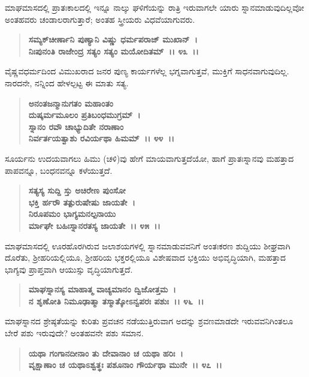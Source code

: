 ಮಾಘಮಾಸದಲ್ಲಿ ಪ್ರಾತಃಕಾಲದಲ್ಲಿ ಇನ್ನೂ ನಾಲ್ಕು ಘಳಿಗೆಯನ್ನು ರಾತ್ರಿ ಇರುವಾಗಲೇ ಯಾರು ಸ್ನಾನಮಾಡುವುದಿಲ್ಲವೋ ಅಂತಹವರು ಚಂಡಾಲರಾಗುತ್ತಾರೆ; ಅಂತಹ ಸ್ತ್ರೀಯರು ವಿಧವೆಯಾಗುವರು.

\begin{verse}
\textbf{ಸಮ್ಯಕ್‌ಚೀರ್ಣಾನಿ ಪುಣ್ಯಾನಿ ವಿಷ್ಣು ಧರ್ಮಪರಾಜ್ ಮುಖಾನ್~।}\\\textbf{ನಿಃಪುನಂತಿ ರಾಜೇಂದ್ರ ಸತ್ಯಂ ಸತ್ಯಂ ಮಯೋದಿತಮ್~।। ೪೩~।।}
\end{verse}

ವೈಷ್ಣವಧರ್ಮದಿಂದ ವಿಮುಖರಾದ ಜನರ ಪುಣ್ಯ ಕಾರ್ಯಗಳೆಲ್ಲ ಭಗ್ನವಾಗುತ್ತವೆ, ಮುಕ್ತಿಗೆ ಸಾಧನವಾಗುವುದಿಲ್ಲ. ನಾರದನೇ, ನನ್ನಿಂದ ಹೇಳಲ್ಪಟ್ಟ ಈ ಮಾತು ಸತ್ಯ.

\begin{verse}
\textbf{ಅನಂತಜನ್ಮಾನುಗತಂ ಮಹಾಂತಂ}\\\textbf{ದುಷ್ಕರ್ಮಮೂಲಂ ಪ್ರತಿಬಂಧಮುಗ್ರಮ್~।}\\\textbf{ಸ್ನಾನಂ ರವೌ ಚಾಭ್ಯುದಿತೇ ನರಾಣಾಂ }\\\textbf{ನಿರ್ವರ್ತಯತ್ವಾಶು ರವಿರ್ಯಥಾ ಹಿಮಮ್~।। ೪೪~।।}
\end{verse}

ಸೂರ್ಯನು ಉದಯವಾಗಲು ಹಿಮು (ಚಳಿ)ವು ಹೇಗೆ ಮಾಯವಾಗುತ್ತದೆಯೋ, ಹಾಗೆ ಪ್ರಾತಃಸ್ನಾನವು ಮಹತ್ತಾದ ಪಾಪವನ್ನೂ, ಬಂಧನವನ್ನೂ ಕಳೆಯುತ್ತದೆ.

\begin{verse}
\textbf{ಸತ್ಯಸ್ಯ ಸುದ್ದಿ ಸ್ತು ಅಚಿರೇಣ ಪುಂಸೋ}\\\textbf{ಭಕ್ತಿ ರ್ಹರೌ ತತ್ಪುರುಷೇಷು ಜಾಯತೇ~।}\\\textbf{ನಿರೂಪಮಂ ಭಾಗ್ಯಮನಲ್ಪನಾಯು\enginline{-}}\\\textbf{ರ್ಮಾಘೇ ಬಹಿಃಸ್ನಾನರತಸ್ಯ ಜಾಯತೇ~।। ೪೫~।।}
\end{verse}

ಮಾಘಮಾಸದಲ್ಲಿ ಊರಹೊರಗಿರುವ ಜಲಾಶಯಗಳಲ್ಲಿ ಸ್ನಾನಮಾಡುವವನಿಗೆ ಅಂತಃ\-ಕರಣ ಶುದ್ದಿಯು ಶೀಘ್ರವಾಗಿ ದೊರೆತು, ಶ‍್ರೀಹರಿಯಲ್ಲಿಯೂ, ಶ‍್ರೀಹರಿಯ ಭಕ್ತರಲ್ಲಿಯೂ ವಿಶೇಷವಾದ ಭಕ್ತಿಯು ಅಭಿವೃದ್ಧಿಯಾಗಿ, ಮಹತ್ತಾದ ಭಾಗ್ಯವು ಪ್ರಾಪ್ತವಾಗಿ ಆಯುಸ್ಸು ವೃದ್ಧಿಯಾಗುತ್ತದೆ.

\begin{verse}
\textbf{ಮಾಘಸ್ನಾನಸ್ಯ ಮಾಹಾತ್ಮ ವಾಚ್ಯಮಾನಂ ದ್ವಿಜೋತ್ತಮ~।}\\\textbf{ನ ಶೃಣೋತಿ ನಿಮೂಢಾತ್ಮಾ ತಸ್ಮಾತ್ಕೋಽನ್ವಪರಃ ಪಶುಃ~।। ೪೬~।।}
\end{verse}

ಮಾಘಸ್ನಾನದ ಶ್ರೇಷ್ಠತೆಯನ್ನು ಕುರಿತು ಪ್ರವಚನ ನಡೆಯುತ್ತಿರುವಾಗ ಅದನ್ನು ಶ್ರವಣಮಾಡದೇ ಇರುವವನಿಗಿಂತಲೂ ಬೇರೆ ಪಶು ಇರುವುದೇ? ಅಂತಹವನೇ ಪಶು ಸಮಾನ.

\begin{verse}
\textbf{ಯಥಾ ಗಂಗಾನದೀನಾಂ ತು ದೇವಾನಾಂ ಚ ಯಥಾ ಹರಿಃ~।}\\\textbf{ವೃಕ್ಷಾಣಾಂ ಚ ಯಥಾಽಶ್ವತ್ಥಃ ಪಶೂನಾಂ ಗೌರ್ಯಥಾ ಮುನೇ~।। ೪೭~।। }
\end{verse}

